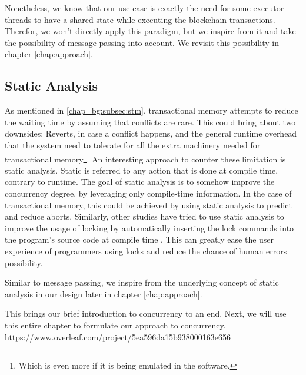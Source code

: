 Nonetheless, we know that our use case is exactly the need for some executor threads to have a
shared state while executing the blockchain transactions. Therefor, we won't directly apply this
paradigm, but we inspire from it and take the possibility of message passing into account. We
revisit this possibility in chapter \ref{chap:approach}.

\subsection{Static Analysis}

As mentioned in \ref{chap_bg:subsec:stm}, transactional memory attempts to reduce the waiting time
by assuming that conflicts are rare. This could bring about two downsides: Reverts, in case a
conflict happens, and the general runtime overhead that the system need to tolerate for all the
extra machinery needed for transactional memory\footnote{Which is even more if it is being emulated
in the software.}. An interesting approach to counter these limitation is static analysis. Static is
referred to any action that is done at compile time, contrary to runtime. The goal of static
analysis is to somehow improve the concurrency degree, by leveraging only compile-time information.
In the case of transactional memory, this could be achieved by using static analysis to predict and
reduce aborts\cite{diasEfficientCorrectTransactional}. Similarly, other studies have tried to use
static analysis to improve the usage of locking by automatically inserting the lock commands into
the program's source code at compile time \cite{cheremInferringLocksAtomic2007}. This can greatly
ease the user experience of programmers using locks and reduce the chance of human errors
possibility.

Similar to message passing, we inspire from the underlying concept of static analysis in our design
later in chapter \ref{chap:approach}.

This brings our brief introduction to concurrency to an end. Next, we will use this entire chapter
to formulate our approach to concurrency.
https://www.overleaf.com/project/5ea596da15b938000163e656